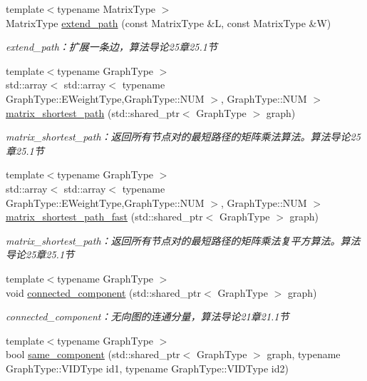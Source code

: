 \begin{DoxyCompactItemize}
{\footnotesize template$<$typename Matrix\+Type $>$ }\\Matrix\+Type \hyperlink{namespace_introduction_to_algorithm_1_1_graph_algorithm_a680307505286ae3230d1843c342e874e}{extend\+\_\+path} (const Matrix\+Type \&L, const Matrix\+Type \&W)
\begin{DoxyCompactList}\small\item\em extend\+\_\+path：扩展一条边，算法导论25章25.1节 \end{DoxyCompactList}\item 
{\footnotesize template$<$typename Graph\+Type $>$ }\\std\+::array$<$ std\+::array$<$ typename Graph\+Type\+::\+E\+Weight\+Type,Graph\+Type\+::\+N\+U\+M $>$, Graph\+Type\+::\+N\+U\+M $>$ \hyperlink{namespace_introduction_to_algorithm_1_1_graph_algorithm_ab9dcca59a42c708c137571d194c45bd9}{matrix\+\_\+shortest\+\_\+path} (std\+::shared\+\_\+ptr$<$ Graph\+Type $>$ graph)
\begin{DoxyCompactList}\small\item\em matrix\+\_\+shortest\+\_\+path：返回所有节点对的最短路径的矩阵乘法算法。算法导论25章25.1节 \end{DoxyCompactList}\item 
{\footnotesize template$<$typename Graph\+Type $>$ }\\std\+::array$<$ std\+::array$<$ typename Graph\+Type\+::\+E\+Weight\+Type,Graph\+Type\+::\+N\+U\+M $>$, Graph\+Type\+::\+N\+U\+M $>$ \hyperlink{namespace_introduction_to_algorithm_1_1_graph_algorithm_a6eb979447eeb937df4158f9646e20dde}{matrix\+\_\+shortest\+\_\+path\+\_\+fast} (std\+::shared\+\_\+ptr$<$ Graph\+Type $>$ graph)
\begin{DoxyCompactList}\small\item\em matrix\+\_\+shortest\+\_\+path：返回所有节点对的最短路径的矩阵乘法复平方算法。算法导论25章25.1节 \end{DoxyCompactList}\item 
{\footnotesize template$<$typename Graph\+Type $>$ }\\void \hyperlink{namespace_introduction_to_algorithm_1_1_graph_algorithm_a31fe8fc6f732112632c51221e739a7d4}{connected\+\_\+component} (std\+::shared\+\_\+ptr$<$ Graph\+Type $>$ graph)
\begin{DoxyCompactList}\small\item\em connected\+\_\+component：无向图的连通分量，算法导论21章21.1节 \end{DoxyCompactList}\item 
{\footnotesize template$<$typename Graph\+Type $>$ }\\bool \hyperlink{namespace_introduction_to_algorithm_1_1_graph_algorithm_ac368f242de9f06c7d936cba4aa0ab40b}{same\+\_\+component} (std\+::shared\+\_\+ptr$<$ Graph\+Type $>$ graph, typename Graph\+Type\+::\+V\+I\+D\+Type id1, typename Graph\+Type\+::\+V\+I\+D\+Type id2)

\end{DoxyCompactItemize}
